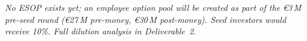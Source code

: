 \documentclass[11pt,a4paper]{article}
\begin{document}
\vspace{2pt}
{\small\textit{No ESOP exists yet; an employee option pool will be created as part of the \euro{}3\,M pre-seed round (\euro{}27\,M pre-money, \euro{}30\,M post-money). Seed investors would receive 10\%. Full dilution analysis in Deliverable~2.}}

\vfill
\end{document}
